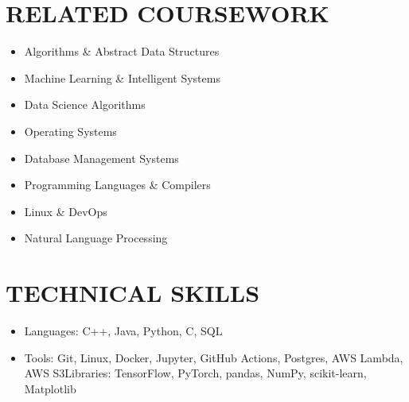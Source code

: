 \documentclass[11pt, a4paper, roman]{moderncv}
\begin{document}
\begin{multicols}{2}
\section{RELATED COURSEWORK}
{\begin{itemize}
\item Algorithms \& Abstract Data Structures
\item Machine Learning \& Intelligent Systems
\item Data Science Algorithms
\item Operating Systems
\item Database Management Systems
\item Programming Languages \& Compilers
\item Linux \& DevOps
\item Natural Language Processing
\end{itemize}}
\columnbreak
\section{TECHNICAL SKILLS}
{\begin{itemize}
\item Languages: C++, Java, Python, C, SQL
\item Tools: Git, Linux, Docker, Jupyter, GitHub Actions, Postgres, AWS Lambda, AWS S3Libraries: TensorFlow, PyTorch, pandas, NumPy, scikit-learn, Matplotlib
\end{itemize}}
\end{multicols}
\end{document}
